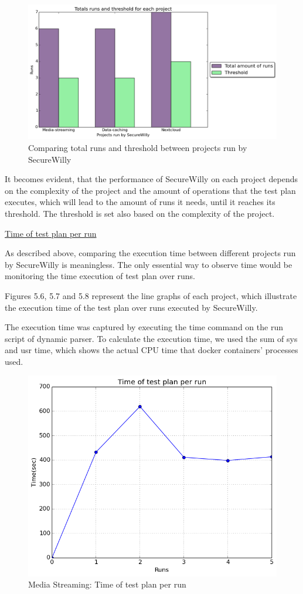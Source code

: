 \begin{figure}[h!]
  \centering
   \includegraphics[width=1\linewidth]{../figures/compare.png}
   \caption{Comparing total runs and threshold between projects run by SecureWilly}
\end{figure}

It becomes evident, that the performance of SecureWilly on each project depends on the complexity of the project and the amount of operations that the test plan executes, which will lead to the amount of runs it needs, until it reaches its threshold. The threshold is set also based on the complexity of the project.

\hfill\break
\underline{Time of test plan per run}
\hfill\break

As described above, comparing the execution time between different projects run by SecureWilly is meaningless. The only essential way to observe time would be monitoring the time execution of test plan over runs.

Figures 5.6, 5.7 and 5.8 represent the line graphs of each project, which illustrate the execution time of the test plan over runs executed by SecureWilly.

The execution time was captured by executing the time command on the run script of dynamic parser. To calculate the execution time, we used the sum of sys and usr time, which shows the actual CPU time that docker containers' processes used.

\begin{figure}[h!]
  \centering
   \includegraphics[width=0.70\linewidth]{../figures/mediastreaming/time.png}
   \caption{Media Streaming: Time of test plan per run}
\end{figure}

